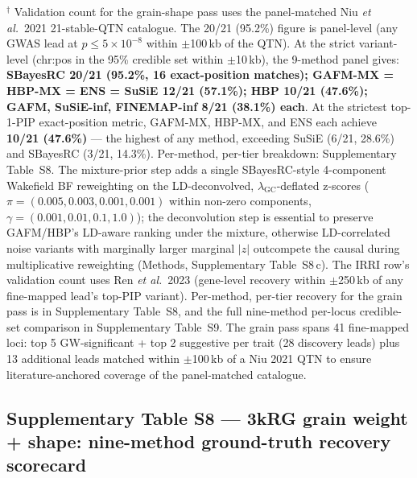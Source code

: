 \begin{table}[htbp]
\vspace{2pt}
\footnotesize{$^\dagger$ Validation count for the grain-shape pass uses the
panel-matched Niu \emph{et al.}\ 2021 \cite{niu2021grain} 21-stable-QTN
catalogue. The 20/21 (95.2\%) figure is panel-level (any GWAS lead at
$p\leq5\times10^{-8}$ within $\pm$100\,kb of the QTN). At the strict
variant-level (chr:pos in the 95\% credible set within $\pm$10\,kb),
the 9-method panel gives:
\textbf{SBayesRC 20/21 (95.2\%, 16 exact-position matches);
GAFM-MX = HBP-MX = ENS = SuSiE 12/21 (57.1\%);
HBP 10/21 (47.6\%);
GAFM, SuSiE-inf, FINEMAP-inf 8/21 (38.1\%) each}.
At the strictest top-1-PIP exact-position metric, GAFM-MX, HBP-MX,
and ENS each achieve \textbf{10/21 (47.6\%)} --- the highest of any
method, exceeding SuSiE (6/21, 28.6\%) and SBayesRC (3/21, 14.3\%). Per-method,
per-tier breakdown: Supplementary Table~S8. The mixture-prior step
adds a single SBayesRC-style 4-component Wakefield BF reweighting
on the LD-deconvolved, $\lambda_{\text{GC}}$-deflated z-scores
($\pi=(0.005, 0.003, 0.001, 0.001)$ within
non-zero components, $\gamma=(0.001, 0.01, 0.1, 1.0)$); the
deconvolution step is essential to preserve GAFM/HBP's LD-aware
ranking under the mixture, otherwise LD-correlated noise variants
with marginally larger marginal $|z|$ outcompete the causal during
multiplicative reweighting (Methods, Supplementary Table~S8\,c). The IRRI row's validation count uses Ren
\emph{et al.}\ 2023 \cite{ren2023rice} (gene-level recovery within
$\pm$250\,kb of any fine-mapped lead's top-PIP variant). Per-method,
per-tier recovery for the grain pass is in Supplementary Table~S8,
and the full nine-method per-locus credible-set comparison in
Supplementary Table~S9.
The grain pass spans 41 fine-mapped loci: top 5 GW-significant + top 2
suggestive per trait (28 discovery leads) plus 13 additional leads
matched within $\pm$100\,kb of a Niu 2021 QTN to ensure literature-anchored
coverage of the panel-matched catalogue.}
\end{table}

\clearpage

\subsection*{Supplementary Table S8 --- 3kRG grain weight + shape: nine-method ground-truth recovery scorecard}



